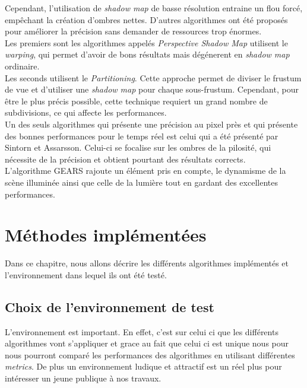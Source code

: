 \documentclass[a4paper,10pt]{report}
\begin{document}
Cependant, l'utilisation de \textit{shadow map} de basse résolution entraine un flou forcé, empêchant la création d'ombres nettes. D'autres algorithmes ont été proposés pour améliorer la précision sans demander de ressources trop énormes. 
\\

Les premiers sont les algorithmes appelés \textit{Perspective Shadow Map}\cite{wimmer2004light,stamminger2002perspective,lloyd2008logarithmic} utilisent le \textit{warping}, qui permet d'avoir de bons résultats mais dégénerent en \textit{shadow map} ordinaire.
\\

Les seconds utilisent le \textit{Partitioning}. Cette approche permet de diviser le frustum de vue et d'utiliser une \textit{shadow map} pour chaque sous-frustum. Cependant, pour être le plus précis possible, cette technique requiert un grand nombre de subdivisions, ce qui affecte les performances.
\\

Un des seuls algorithmes qui présente une précision au pixel près et qui présente des bonnes performances pour le temps réel est celui qui a été présenté par Sintorn et Assarsson\cite{sintorn2009hair}. Celui-ci se focalise sur les ombres de la pilosité, qui nécessite de la précision et obtient pourtant des résultats corrects.
\\

L'algorithme GEARS\cite{wang2014gears} rajoute un élément pris en compte, le dynamisme de la scène illuminée ainsi que celle de la lumière tout en gardant des excellentes performances.


\chapter{Méthodes implémentées}

Dans ce chapitre, nous allons décrire les différents algorithmes implémentés et l'environnement dans lequel ils ont été testé.

\section{Choix de l'environnement de test}

L'environnement est important. En effet, c'est sur celui ci que les différents algorithmes vont s'appliquer et grace au fait que celui ci est unique nous pour nous pourront comparé les performances des algorithmes en utilisant différentes \textit{metrics}. De plus un environnement ludique et attractif est un réel plus pour intéresser un jeune publique à nos travaux.
\end{document}
